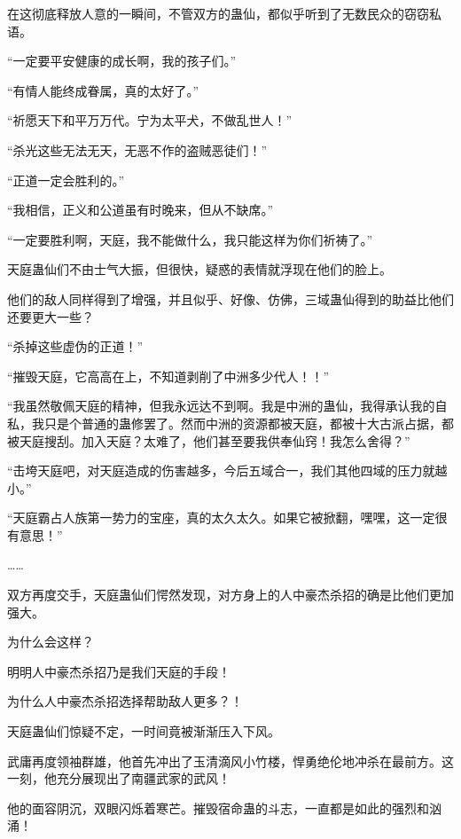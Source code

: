 
\begin{this_body}



在这彻底释放人意的一瞬间，不管双方的蛊仙，都似乎听到了无数民众的窃窃私语。

“一定要平安健康的成长啊，我的孩子们。”

“有情人能终成眷属，真的太好了。”

“祈愿天下和平万万代。宁为太平犬，不做乱世人！”

“杀光这些无法无天，无恶不作的盗贼恶徒们！”

“正道一定会胜利的。”

“我相信，正义和公道虽有时晚来，但从不缺席。”

“一定要胜利啊，天庭，我不能做什么，我只能这样为你们祈祷了。”

天庭蛊仙们不由士气大振，但很快，疑惑的表情就浮现在他们的脸上。

他们的敌人同样得到了增强，并且似乎、好像、仿佛，三域蛊仙得到的助益比他们还要更大一些？

“杀掉这些虚伪的正道！”

“摧毁天庭，它高高在上，不知道剥削了中洲多少代人！！”

“我虽然敬佩天庭的精神，但我永远达不到啊。我是中洲的蛊仙，我得承认我的自私，我只是个普通的蛊修罢了。然而中洲的资源都被天庭，都被十大古派占据，都被天庭搜刮。加入天庭？太难了，他们甚至要我供奉仙窍！我怎么舍得？”

“击垮天庭吧，对天庭造成的伤害越多，今后五域合一，我们其他四域的压力就越小。”

“天庭霸占人族第一势力的宝座，真的太久太久。如果它被掀翻，嘿嘿，这一定很有意思！”

……

双方再度交手，天庭蛊仙们愕然发现，对方身上的人中豪杰杀招的确是比他们更加强大。

为什么会这样？

明明人中豪杰杀招乃是我们天庭的手段！

为什么人中豪杰杀招选择帮助敌人更多？！

天庭蛊仙们惊疑不定，一时间竟被渐渐压入下风。

武庸再度领袖群雄，他首先冲出了玉清滴风小竹楼，悍勇绝伦地冲杀在最前方。这一刻，他充分展现出了南疆武家的武风！

他的面容阴沉，双眼闪烁着寒芒。摧毁宿命蛊的斗志，一直都是如此的强烈和汹涌！


\end{this_body}
